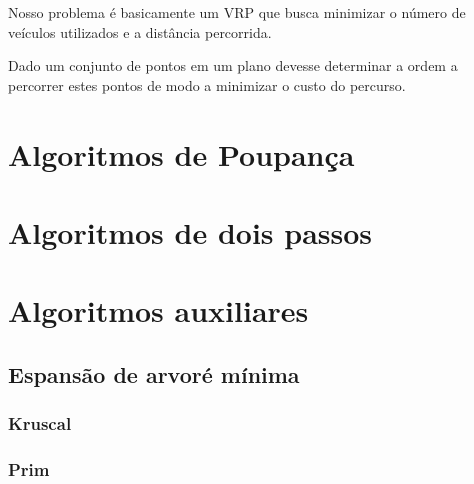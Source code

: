 	Nosso problema é basicamente um VRP que busca minimizar o número de veículos utilizados e a
distância percorrida.



	Dado um conjunto de pontos em um plano devesse determinar a ordem a percorrer estes pontos de
modo a minimizar o custo do percurso.



\chapter{Algoritmos de Poupança}



\chapter{Algoritmos de dois passos}


\chapter{Algoritmos auxiliares}


\section{Espansão de arvoré mínima}
\subsection{Kruscal}
\subsection{Prim}





